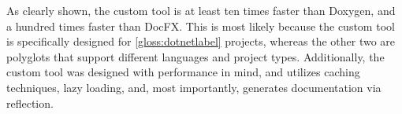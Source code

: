 As clearly shown, the custom tool is at least ten times faster than Doxygen, and a hundred times faster than DocFX. This is most likely because the custom tool is specifically designed for \ref{gloss:dotnetlabel} projects, whereas the other two are polyglots that support different languages and project types. Additionally, the custom tool was designed with performance in mind, and utilizes caching techniques, lazy loading, and, most importantly, generates documentation via reflection.